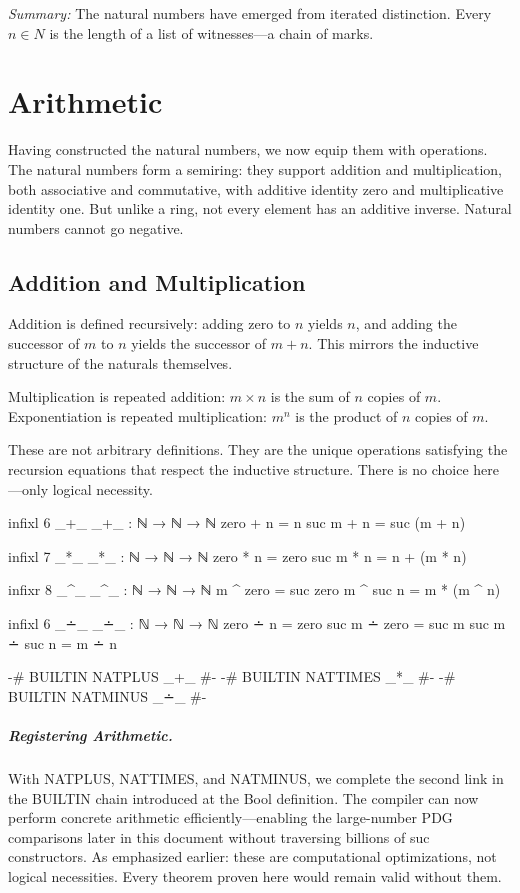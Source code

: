 \documentclass[11pt,a4paper]{book}
\def\mathbb#1{#1}%
\def\texttt#1{#1}%
\begin{document}
\medskip
\noindent\textit{Summary:} The natural numbers have emerged from iterated distinction. 
Every $n \in \mathbb{N}$ is the length of a list of witnesses—a chain of marks.

\chapter{Arithmetic}

Having constructed the natural numbers, we now equip them with operations. The natural 
numbers form a semiring: they support addition and multiplication, both associative and 
commutative, with additive identity zero and multiplicative identity one. But unlike a 
ring, not every element has an additive inverse. Natural numbers cannot go negative.

\section{Addition and Multiplication}

Addition is defined recursively: adding zero to $n$ yields $n$, and adding the successor 
of $m$ to $n$ yields the successor of $m + n$. This mirrors the inductive structure 
of the naturals themselves.

Multiplication is repeated addition: $m \times n$ is the sum of $n$ copies of $m$. 
Exponentiation is repeated multiplication: $m^n$ is the product of $n$ copies of $m$.

These are not arbitrary definitions. They are the unique operations satisfying the 
recursion equations that respect the inductive structure. There is no choice here—only 
logical necessity.

\begin{code}
infixl 6 _+_
_+_ : ℕ → ℕ → ℕ
zero  + n = n
suc m + n = suc (m + n)

infixl 7 _*_
_*_ : ℕ → ℕ → ℕ
zero  * n = zero
suc m * n = n + (m * n)

infixr 8 _^_
_^_ : ℕ → ℕ → ℕ
m ^ zero    = suc zero
m ^ suc n   = m * (m ^ n)

infixl 6 _∸_
_∸_ : ℕ → ℕ → ℕ
zero  ∸ n     = zero
suc m ∸ zero  = suc m
suc m ∸ suc n = m ∸ n

{-# BUILTIN NATPLUS  _+_ #-}
{-# BUILTIN NATTIMES _*_ #-}
{-# BUILTIN NATMINUS _∸_ #-}
\end{code}

\paragraph{Registering Arithmetic.}
With \texttt{NATPLUS}, \texttt{NATTIMES}, and \texttt{NATMINUS}, we complete the second 
link in the BUILTIN chain introduced at the Bool definition. The compiler can now perform 
concrete arithmetic efficiently—enabling the large-number PDG comparisons later in this 
document without traversing billions of \texttt{suc} constructors. As emphasized earlier: 
these are computational optimizations, not logical necessities. Every theorem proven here 
would remain valid without them.
\end{document}
